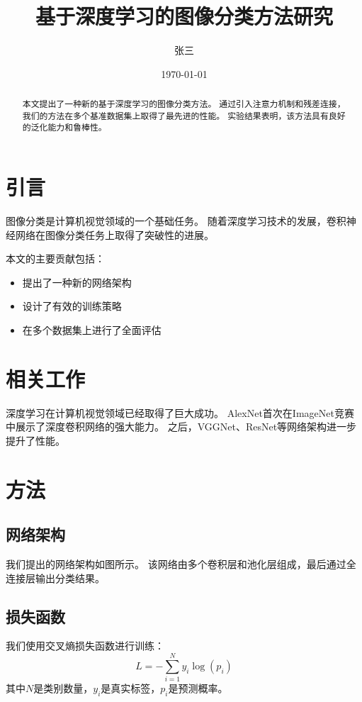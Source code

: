 \documentclass[12pt]{article}
\title{基于深度学习的图像分类方法研究}
\author{张三}
\date{\today}
\begin{document}
\maketitle

\begin{abstract}
本文提出了一种新的基于深度学习的图像分类方法。
通过引入注意力机制和残差连接，我们的方法在多个基准数据集上取得了最先进的性能。
实验结果表明，该方法具有良好的泛化能力和鲁棒性。
\end{abstract}

\section{引言}

图像分类是计算机视觉领域的一个基础任务。
随着深度学习技术的发展，卷积神经网络在图像分类任务上取得了突破性的进展。

本文的主要贡献包括：
\begin{itemize}
    \item 提出了一种新的网络架构
    \item 设计了有效的训练策略
    \item 在多个数据集上进行了全面评估
\end{itemize}

\section{相关工作}

深度学习在计算机视觉领域已经取得了巨大成功。
AlexNet首次在ImageNet竞赛中展示了深度卷积网络的强大能力。
之后，VGGNet、ResNet等网络架构进一步提升了性能。

\section{方法}

\subsection{网络架构}

我们提出的网络架构如图所示。
该网络由多个卷积层和池化层组成，最后通过全连接层输出分类结果。

\subsection{损失函数}

我们使用交叉熵损失函数进行训练：
\begin{equation}
    L = -\sum_{i=1}^{N} y_i \log(p_i)
    \label{eq:loss}
\end{equation}
其中$N$是类别数量，$y_i$是真实标签，$p_i$是预测概率。
\end{document}
